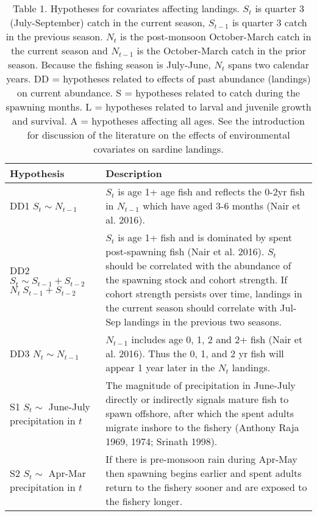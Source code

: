 
\renewcommand{\arraystretch}{1.2}


\begin{table}

\caption{\label{tab:print-table-hyp}Table 1. Hypotheses for covariates affecting landings.  $S_t$ is quarter 3 (July-September) catch in the current season, $S_{t-1}$ is quarter 3 catch in the previous season. $N_t$ is the post-monsoon October-March catch in the current season and $N_{t-1}$ is the October-March catch in the prior season. Because the fishing season is July-June, $N_t$ spans two calendar years. DD = hypotheses related to effects of past abundance (landings) on current abundance. S = hypotheses related to catch during the spawning months. L = hypotheses related to larval and juvenile growth and survival. A = hypotheses affecting all ages. See the introduction for discussion of the literature on the effects of environmental covariates on sardine landings.}
\centering
\begin{tabular}[t]{>{\raggedright\arraybackslash}p{5.5cm}|>{\raggedright\arraybackslash}p{10cm}}
\hline
Hypothesis & Description\\
\hline
DD1 \newline $S_t \sim N_{t-1}$ & $S_t$ is age 1+ age fish and reflects the 0-2yr fish in $N_{t-1}$ which have aged 3-6 months (Nair et al. 2016).\\
\hline
DD2 \newline $S_t \sim S_{t-1} + S_{t-2}$ 
 $N_t ~ S_{t-1} + S_{t-2}$ & $S_t$ is age 1+ fish and is dominated by spent post-spawning fish (Nair et al. 2016). $S_t$ should be correlated with the abundance of the spawning stock and cohort strength. If cohort strength persists over time, landings in the current season should correlate with Jul-Sep landings in the previous two seasons.\\
\hline
DD3 \newline $N_t \sim N_{t-1}$ & $N_{t-1}$ includes age 0, 1, 2 and 2+ fish (Nair et al. 2016). Thus the 0, 1, and 2 yr fish will appear 1 year later in the $N_t$ landings.\\
\hline
S1 \newline $S_t \sim$ June-July precipitation in $t$ & The magnitude of precipitation in June-July directly or indirectly signals mature fish to spawn offshore, after which the spent adults migrate inshore to the fishery (Anthony Raja 1969, 1974; Srinath 1998).\\
\hline
S2 \newline $S_t \sim$ Apr-Mar precipitation in $t$ & If there is pre-monsoon rain during Apr-May then spawning begins earlier and spent adults return to the fishery sooner and are exposed to the fishery longer.\\

\end{tabular}
\end{table}
